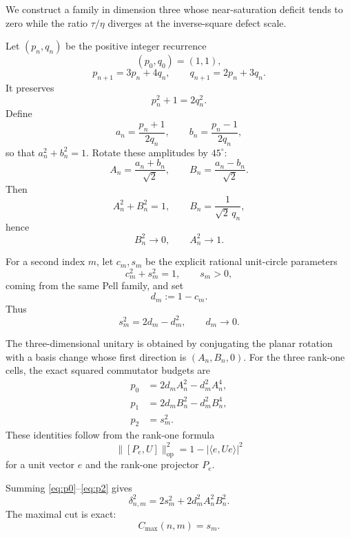 \documentclass[11pt]{article}
\newcommand{\op}{\mathrm{op}}
\newcommand{\cmax}{C_{\max}}
\newcommand{\dd}{\delta}
\newcommand{\etaq}{\eta}
\newcommand{\tauq}{\tau}
\begin{document}
We construct a family in dimension three whose near-saturation deficit tends
to zero while the ratio $\tauq/\etaq$ diverges at the inverse-square defect
scale.

Let $(p_n,q_n)$ be the positive integer recurrence
\[
  (p_0,q_0)=(1,1),
\]
\[
  p_{n+1}=3p_n+4q_n,
  \qquad
  q_{n+1}=2p_n+3q_n.
\]
It preserves
\begin{equation}\label{eq:pell}
  p_n^2+1=2q_n^2.
\end{equation}
Define
\[
  a_n=\frac{p_n+1}{2q_n},
  \qquad
  b_n=\frac{p_n-1}{2q_n},
\]
so that $a_n^2+b_n^2=1$.  Rotate these amplitudes by $45^\circ$:
\begin{equation}\label{eq:AB}
  A_n=\frac{a_n+b_n}{\sqrt2},
  \qquad
  B_n=\frac{a_n-b_n}{\sqrt2}.
\end{equation}
Then
\[
  A_n^2+B_n^2=1,\qquad
  B_n=\frac{1}{\sqrt2\,q_n},
\]
hence
\begin{equation}\label{eq:AB-limits}
  B_n^2\to0,\qquad A_n^2\to1.
\end{equation}

For a second index $m$, let $c_m,s_m$ be the explicit rational unit-circle
parameters
\[
  c_m^2+s_m^2=1,\qquad s_m>0,
\]
coming from the same Pell family, and set
\begin{equation}\label{eq:d}
  d_m:=1-c_m.
\end{equation}
Thus
\begin{equation}\label{eq:s-d}
  s_m^2=2d_m-d_m^2,
  \qquad
  d_m\to0.
\end{equation}

The three-dimensional unitary is obtained by conjugating the planar rotation
with a basis change whose first direction is
$(A_n,B_n,0)$.  For the three rank-one cells, the exact squared commutator
budgets are
\begin{align}
  p_0 &=
  2d_mA_n^2-d_m^2A_n^4, \label{eq:p0}\\
  p_1 &=
  2d_mB_n^2-d_m^2B_n^4, \label{eq:p1}\\
  p_2 &= s_m^2. \label{eq:p2}
\end{align}
These identities follow from the rank-one formula
\begin{equation}\label{eq:rankone}
  \boxed{
  \|[P_e,U]\|_{\op}^2
  =
  1-\bigl|\langle e,Ue\rangle\bigr|^2
  }
\end{equation}
for a unit vector $e$ and the rank-one projector $P_e$.

Summing \eqref{eq:p0}--\eqref{eq:p2} gives
\begin{equation}\label{eq:global-sharp}
  \boxed{
  \dd_{n,m}^2
  =
  2s_m^2+
  2d_m^2A_n^2B_n^2.
  }
\end{equation}
The maximal cut is exact:
\begin{equation}\label{eq:cmax-sharp}
  \boxed{
  \cmax(n,m)=s_m.
  }
\end{equation}
\end{document}
